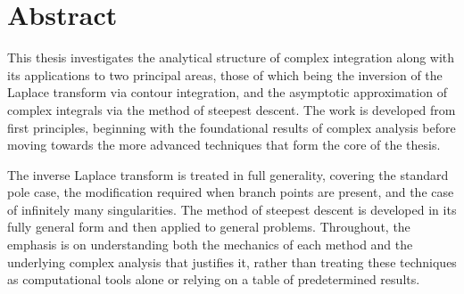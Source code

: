 \chapter{Abstract}


This thesis investigates the analytical structure of complex integration along with its applications to two principal areas, those of which being the inversion of the Laplace transform via contour integration, and the asymptotic approximation of complex integrals via the method of steepest descent. The work is developed from first principles, beginning with the foundational results of complex analysis before moving towards the more advanced techniques that form the core of the thesis.

The inverse Laplace transform is treated in full generality, covering the standard pole case, the modification required when branch points are present, and the case of infinitely many singularities. The method of steepest descent is developed in its fully general form and then applied to general problems. Throughout, the emphasis is on understanding both the mechanics of each method and the underlying complex analysis that justifies it, rather than treating these techniques as computational tools alone or relying on a table of predetermined results.